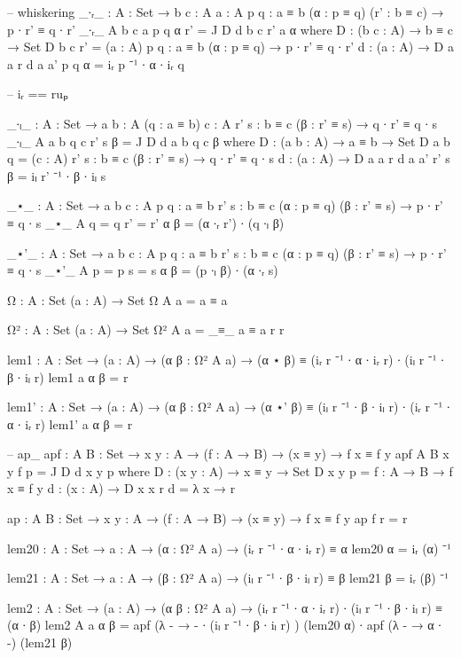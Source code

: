 \documentclass[11pt, a4paper]{article}
\begin{document}
\begin{code}

  -- whiskering
  _∙ᵣ_ : {A : Set} → {b c : A} {a : A} {p q : a ≡ b} (α : p ≡ q) (r' : b ≡ c) → p ∙ r' ≡ q ∙ r'
  _∙ᵣ_ {A} {b} {c} {a} {p} {q} α r' = J D d b c r' a α
    where
      D : (b c : A) → b ≡ c → Set
      D b c r' = (a : A) {p q : a ≡ b} (α : p ≡ q) → p ∙ r' ≡ q ∙ r'
      d : (a : A) → D a a r
      d a a' {p} {q} α = iᵣ p ⁻¹ ∙ α ∙ iᵣ q

  -- iᵣ == ruₚ

  _∙ₗ_ : {A : Set} → {a b : A} (q : a ≡ b) {c : A} {r' s : b ≡ c} (β : r' ≡ s) → q ∙ r' ≡ q ∙ s
  _∙ₗ_ {A} {a} {b} q {c} {r'} {s} β = J D d a b q c β
    where
      D : (a b : A) → a ≡ b → Set
      D a b q = (c : A) {r' s : b ≡ c} (β : r' ≡ s) → q ∙ r' ≡ q ∙ s
      d : (a : A) → D a a r
      d a a' {r'} {s} β = iₗ r' ⁻¹ ∙ β ∙ iₗ s

  _⋆_ : {A : Set} → {a b c : A} {p q : a ≡ b} {r' s : b ≡ c} (α : p ≡ q) (β : r' ≡ s) → p ∙ r' ≡ q ∙ s
  _⋆_ {A} {q = q} {r' = r'} α β = (α ∙ᵣ r') ∙ (q ∙ₗ β)

  _⋆'_ : {A : Set} → {a b c : A} {p q : a ≡ b} {r' s : b ≡ c} (α : p ≡ q) (β : r' ≡ s) → p ∙ r' ≡ q ∙ s
  _⋆'_ {A} {p = p} {s = s} α β =  (p ∙ₗ β) ∙ (α ∙ᵣ s)

  Ω : {A : Set} (a : A) → Set
  Ω {A} a = a ≡ a

  Ω² : {A : Set} (a : A) → Set
  Ω² {A} a = _≡_ {a ≡ a} r r 

  lem1 : {A : Set} → (a : A) → (α β : Ω² {A} a) → (α ⋆ β) ≡ (iᵣ r ⁻¹ ∙ α ∙ iᵣ r) ∙ (iₗ r ⁻¹ ∙ β ∙ iₗ r)
  lem1 a α β = r

  lem1' : {A : Set} → (a : A) → (α β : Ω² {A} a) → (α ⋆' β) ≡  (iₗ r ⁻¹ ∙ β ∙ iₗ r) ∙ (iᵣ r ⁻¹ ∙ α ∙ iᵣ r)
  lem1' a α β = r

  -- ap\_
  apf : {A B : Set} → {x y : A} → (f : A → B) → (x ≡ y) → f x ≡ f y
  apf {A} {B} {x} {y} f p = J D d x y p
    where
      D : (x y : A) → x ≡ y → Set
      D x y p = {f : A → B} → f x ≡ f y
      d : (x : A) → D x x r
      d = λ x → r 

  ap : {A B : Set} → {x y : A} → (f : A → B) → (x ≡ y) → f x ≡ f y
  ap f r = r

  lem20 : {A : Set} → {a : A} → (α : Ω² {A} a) → (iᵣ r ⁻¹ ∙ α ∙ iᵣ r) ≡ α
  lem20 α = iᵣ (α) ⁻¹

  lem21 : {A : Set} → {a : A} → (β : Ω² {A} a) → (iₗ r ⁻¹ ∙ β ∙ iₗ r) ≡ β
  lem21 β = iᵣ (β) ⁻¹

  lem2 : {A : Set} → (a : A) → (α β : Ω² {A} a) → (iᵣ r ⁻¹ ∙ α ∙ iᵣ r) ∙ (iₗ r ⁻¹ ∙ β ∙ iₗ r) ≡ (α ∙ β)
  lem2 {A} a α β = apf (λ - → - ∙ (iₗ r ⁻¹ ∙ β ∙ iₗ r) ) (lem20 α) ∙ apf (λ - → α ∙ -) (lem21 β)


\end{code}
\end{document}
